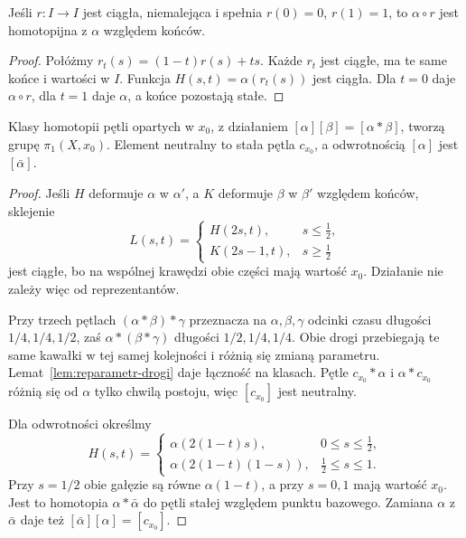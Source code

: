 \begin{lemat}
\label{lem:reparametr-drogi}
Jeśli $r:I\to I$ jest ciągła, niemalejąca
i spełnia $r(0)=0$, $r(1)=1$, to
$\alpha\circ r$ jest homotopijna z $\alpha$
względem końców.
\end{lemat}
\begin{proof}
Połóżmy $r_t(s)=(1-t)r(s)+ts$.
Każde $r_t$ jest ciągłe, ma te same końce
i wartości w $I$. Funkcja
$H(s,t)=\alpha(r_t(s))$ jest ciągła.
Dla $t=0$ daje $\alpha\circ r$, dla $t=1$
daje $\alpha$, a końce pozostają stałe.
\end{proof}

\begin{twierdzenie}
\label{thm:grupa-podstawowa}
Klasy homotopii pętli opartych w $x_0$,
z działaniem $[\alpha][\beta]=[\alpha*\beta]$,
tworzą grupę $\pi_1(X,x_0)$.
Element neutralny to stała pętla $c_{x_0}$,
a odwrotnością $[\alpha]$ jest $[\bar\alpha]$.
\end{twierdzenie}
\begin{proof}
Jeśli $H$ deformuje $\alpha$ w $\alpha'$,
a $K$ deformuje $\beta$ w $\beta'$
względem końców, sklejenie
\[
 L(s,t)=
 \begin{cases}
   H(2s,t),&s\leq\tfrac12,\\
   K(2s-1,t),&s\geq\tfrac12
 \end{cases}
\]
jest ciągłe, bo na wspólnej krawędzi
obie części mają wartość $x_0$.
Działanie nie zależy więc od reprezentantów.

Przy trzech pętlach $(\alpha*\beta)*\gamma$
przeznacza na $\alpha,\beta,\gamma$
odcinki czasu długości $1/4,1/4,1/2$,
zaś $\alpha*(\beta*\gamma)$ długości
$1/2,1/4,1/4$. Obie drogi przebiegają
te same kawałki w tej samej kolejności
i różnią się zmianą parametru.
Lemat~\ref{lem:reparametr-drogi} daje łączność
na klasach. Pętle $c_{x_0}*\alpha$
i $\alpha*c_{x_0}$ różnią się od $\alpha$
tylko chwilą postoju, więc
$[c_{x_0}]$ jest neutralny.

Dla odwrotności określmy
\[
 H(s,t)=
 \begin{cases}
  \alpha(2(1-t)s),&0\leq s\leq\tfrac12,\\
  \alpha(2(1-t)(1-s)),&\tfrac12\leq s\leq1.
 \end{cases}
\]
Przy $s=1/2$ obie gałęzie są równe
$\alpha(1-t)$, a przy $s=0,1$ mają
wartość $x_0$. Jest to homotopia
$\alpha*\bar\alpha$ do pętli stałej
względem punktu bazowego. Zamiana
$\alpha$ z $\bar\alpha$ daje też
$[\bar\alpha][\alpha]=[c_{x_0}]$.
\end{proof}

